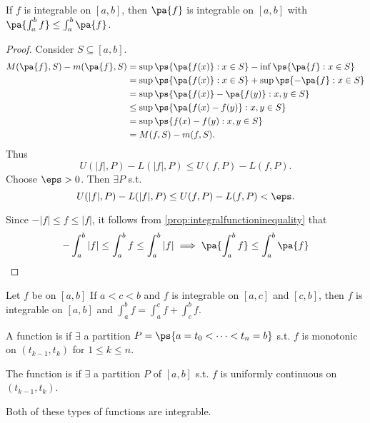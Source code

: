 \documentclass[11pt]{scrartcl}
\numberwithin{equation}{section}
\begin{document}
\begin{proposition}
    If $f$ is integrable on $[a,b]$, then $\pa{f}$ is integrable on $[a,b]$
    with $\pa{\int_a^b f}\leq \int_a^b\pa{f}$.
\end{proposition}

\begin{proof}
    Consider $S \subseteq [a,b]$. 
    \begin{align*}
        M(\pa{f},S)-m(\pa{f},S) &= \sup\ps{\pa{f(x)} : x\in S} - \inf\ps{\pa{f} : x\in S} \\
        &= \sup\ps{\pa{f(x)} : x\in S} + \sup\ps{-\pa{f} : x\in S} \\ 
        &= \sup\ps{\pa{f(x)} - \pa{f(y)} : x,y\in S} \\
        &\leq \sup\ps{\pa{f(x) - f(y)} : x,y\in S} \\
        &= \sup\ps{f(x) - f(y):x,y\in S} \\
        &= M(f,S) - m(f,S).
    \end{align*}
    Thus 
    \[
        U(|f|,P) - L(|f|,P) \leq U(f,P) - L(f,P).
    \]
    Choose $\eps>0$. Then $\exists P$ s.t. 
    \[
        U(|f|,P) - L(|f|,P) \leq U(f,P) - L(f,P) < \eps.
    \]

    Since $-|f| \leq f \leq |f|$, it follows from \cref{prop:integralfunctioninequality} that 
    \[
        -\int_a^b|f| \leq \int_a^bf \leq \int_a^b|f| \implies 
        \pa{\int_a^b f}\leq \int_a^b\pa{f}\qedhere
    \]
\end{proof}

\begin{proposition}
    Let $f$ be on $[a,b]$ If $a<c<b$ and $f$ is integrable on $[a,c]$ 
    and $[c,b]$, then $f$ is integrable on $[a,b]$ and 
    $\int_a^bf = \int_a^cf+\int_c^bf$.
\end{proposition}

\begin{definition}
    A function is  if $\exists$ a partition 
    $P = \ps{a=t_0<\cdots<t_n=b}$ s.t. $f$ is monotonic on $(t_{k-1}, t_k)$ 
    for $1\leq k\leq n$. 
    
    The function is 
    if $\exists$ a partition $P$ of $[a,b]$ s.t. $f$ is 
    uniformly continuous on $(t_{k-1},t_k)$.
\end{definition}

Both of these types of functions are integrable.

\clearpage
\end{document}
